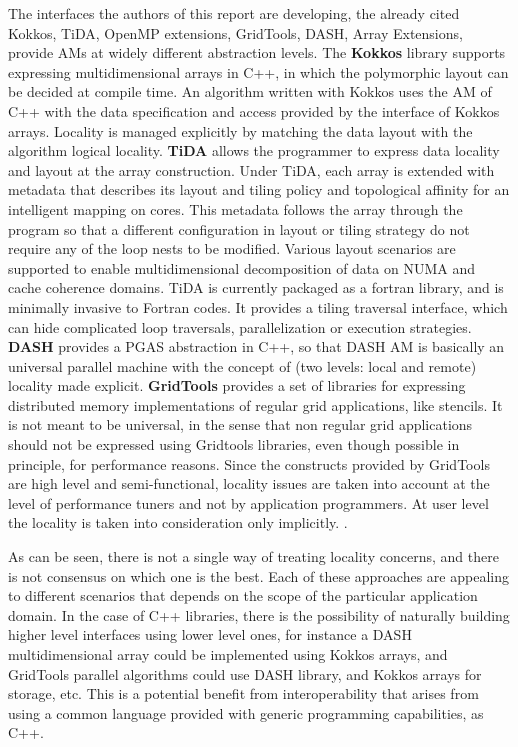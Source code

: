 The interfaces the authors of this report are developing, the already
cited Kokkos, TiDA, OpenMP extensions, GridTools, DASH, Array
Extensions, provide AMs at widely different abstraction levels. 
The {\bf Kokkos} library supports expressing
multidimensional arrays in C++, in which the polymorphic layout can be decided at
compile time. An algorithm written with Kokkos uses the AM of C++ with
the data specification and access provided by the interface of Kokkos
arrays. Locality is managed explicitly by matching the data layout
with the algorithm logical locality. 
{\bf TiDA} allows the programmer to express data locality and layout  at the array construction. 
 Under TiDA, each array is extended with metadata that describes its layout and tiling policy and topological affinity for an intelligent mapping on cores.  This metadata follows the array through the program so that a different configuration in layout or tiling strategy do not require any of the loop nests to be modified. Various layout scenarios are supported to enable multidimensional decomposition of data on NUMA  and cache coherence domains. 
TiDA is currently packaged as a fortran library, and is minimally invasive to Fortran codes.  It provides a tiling traversal interface, which can hide complicated loop traversals, parallelization or execution strategies. 
{\bf DASH} provides a PGAS abstraction in C++, so that DASH AM is
basically an universal parallel machine with the concept of (two
levels: local and remote) locality made explicit. {\bf GridTools} provides a
set of libraries for expressing distributed memory implementations of
regular grid applications, like stencils. It is not meant to be
universal, in the sense that non regular grid applications should not
be expressed using Gridtools libraries, even though possible in
principle, for performance reasons. Since the constructs provided by
GridTools are high level and semi-functional, locality issues are
taken into account at the level of performance tuners and not by
application programmers. At user level the locality is taken into
consideration only implicitly. . 
  
  As can be seen, there is not a single way of treating
locality concerns, and there is not consensus on which one is the
best. Each of these approaches are appealing to different scenarios
that depends on the scope of the particular application domain. In the case of
C++ libraries, there is the possibility of naturally building
higher level interfaces using lower level ones, for instance a DASH
multidimensional array could be implemented using Kokkos arrays, and
GridTools parallel algorithms could use DASH library, and Kokkos
arrays for storage, etc. This is a potential benefit from
interoperability that arises from using a common language provided with
generic programming capabilities, as C++.


